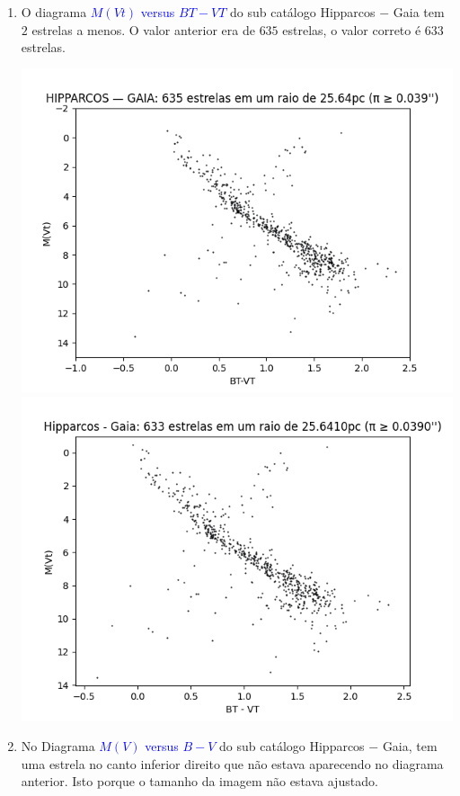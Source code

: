 \documentclass{article}
\begin{document}
\begin{enumerate}
		\item O diagrama \textcolor{blue}{$M(Vt)$ versus $BT-VT$} do sub catálogo Hipparcos $-$ Gaia tem $2$ estrelas a menos. O valor anterior era de $635$ estrelas, o valor correto é $633$ estrelas. 
		
		\begin{multicols}{2}
			\centering
			\includegraphics[width=.98\linewidth]{hipparcos_minus_gaia_mvt_versus_bt_minus_vt_plx_greater_than_or_iqual_to_0.039.png}
			\columnbreak
			\includegraphics[width=.98\linewidth]{Hipparcos_minus_Gaia_MVt_versus_BT_minus_VT.png}
		\end{multicols}
		
		\item No Diagrama \textcolor{blue}{$M(V)$ versus $B-V$} do sub catálogo Hipparcos $-$ Gaia, tem uma estrela no canto inferior direito que não estava aparecendo no diagrama anterior. Isto porque o tamanho da imagem não estava ajustado.


\end{enumerate}
\end{document}
